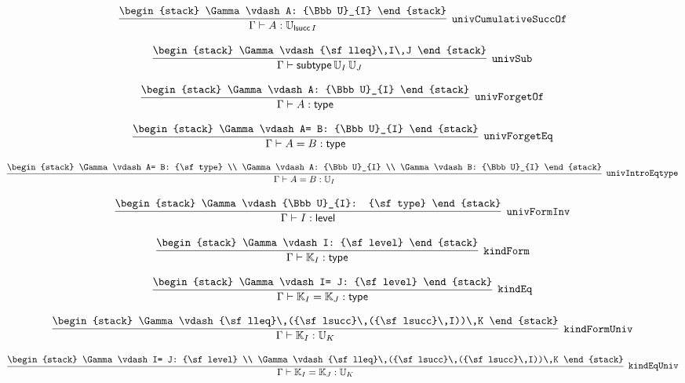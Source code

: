 \[
\infer[{\tt univCumulativeSuccOf}]{\Gamma \vdash A: {\Bbb U}_{{\sf lsucc}\,I}}{
\begin{stack}
\Gamma \vdash A: {\Bbb U}_{I}
\end{stack}}
\]

\[
\infer[{\tt univSub}]{\Gamma \vdash {\sf subtype}\,{\Bbb U}_{I}\,{\Bbb U}_{J}}{
\begin{stack}
\Gamma \vdash {\sf lleq}\,I\,J
\end{stack}}
\]

\[
\infer[{\tt univForgetOf}]{\Gamma \vdash A: {\sf type}}{
\begin{stack}
\Gamma \vdash A: {\Bbb U}_{I}
\end{stack}}
\]

\[
\infer[{\tt univForgetEq}]{\Gamma \vdash A= B: {\sf type}}{
\begin{stack}
\Gamma \vdash A= B: {\Bbb U}_{I}
\end{stack}}
\]

\[
\infer[{\tt univIntroEqtype}]{\Gamma \vdash A= B: {\Bbb U}_{I}}{
\begin{stack}
\Gamma \vdash A= B: {\sf type}
\\
\Gamma \vdash A: {\Bbb U}_{I}
\\
\Gamma \vdash B: {\Bbb U}_{I}
\end{stack}}
\]

\[
\infer[{\tt univFormInv}]{\Gamma \vdash I: {\sf level}}{
\begin{stack}
\Gamma \vdash {\Bbb U}_{I}: {\sf type}
\end{stack}}
\]

\[
\infer[{\tt kindForm}]{\Gamma \vdash {\Bbb K}_{I}: {\sf type}}{
\begin{stack}
\Gamma \vdash I: {\sf level}
\end{stack}}
\]

\[
\infer[{\tt kindEq}]{\Gamma \vdash {\Bbb K}_{I}= {\Bbb K}_{J}: {\sf type}}{
\begin{stack}
\Gamma \vdash I= J: {\sf level}
\end{stack}}
\]

\[
\infer[{\tt kindFormUniv}]{\Gamma \vdash {\Bbb K}_{I}: {\Bbb U}_{K}}{
\begin{stack}
\Gamma \vdash {\sf lleq}\,({\sf lsucc}\,({\sf lsucc}\,I))\,K
\end{stack}}
\]

\[
\infer[{\tt kindEqUniv}]{\Gamma \vdash {\Bbb K}_{I}= {\Bbb K}_{J}: {\Bbb U}_{K}}{
\begin{stack}
\Gamma \vdash I= J: {\sf level}
\\
\Gamma \vdash {\sf lleq}\,({\sf lsucc}\,({\sf lsucc}\,I))\,K
\end{stack}}
\]

